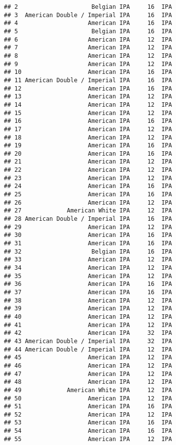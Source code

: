 \documentclass[
]{article}
\begin{document}
\begin{verbatim}
## 2                     Belgian IPA     16  IPA
## 3  American Double / Imperial IPA     16  IPA
## 4                    American IPA     16  IPA
## 5                     Belgian IPA     16  IPA
## 6                    American IPA     12  IPA
## 7                    American IPA     12  IPA
## 8                    American IPA     12  IPA
## 9                    American IPA     12  IPA
## 10                   American IPA     16  IPA
## 11 American Double / Imperial IPA     16  IPA
## 12                   American IPA     16  IPA
## 13                   American IPA     12  IPA
## 14                   American IPA     12  IPA
## 15                   American IPA     12  IPA
## 16                   American IPA     16  IPA
## 17                   American IPA     12  IPA
## 18                   American IPA     12  IPA
## 19                   American IPA     16  IPA
## 20                   American IPA     16  IPA
## 21                   American IPA     12  IPA
## 22                   American IPA     12  IPA
## 23                   American IPA     12  IPA
## 24                   American IPA     16  IPA
## 25                   American IPA     16  IPA
## 26                   American IPA     12  IPA
## 27             American White IPA     12  IPA
## 28 American Double / Imperial IPA     16  IPA
## 29                   American IPA     12  IPA
## 30                   American IPA     16  IPA
## 31                   American IPA     16  IPA
## 32                    Belgian IPA     16  IPA
## 33                   American IPA     12  IPA
## 34                   American IPA     12  IPA
## 35                   American IPA     12  IPA
## 36                   American IPA     16  IPA
## 37                   American IPA     16  IPA
## 38                   American IPA     12  IPA
## 39                   American IPA     12  IPA
## 40                   American IPA     12  IPA
## 41                   American IPA     12  IPA
## 42                   American IPA     32  IPA
## 43 American Double / Imperial IPA     32  IPA
## 44 American Double / Imperial IPA     12  IPA
## 45                   American IPA     12  IPA
## 46                   American IPA     12  IPA
## 47                   American IPA     12  IPA
## 48                   American IPA     12  IPA
## 49             American White IPA     12  IPA
## 50                   American IPA     12  IPA
## 51                   American IPA     16  IPA
## 52                   American IPA     12  IPA
## 53                   American IPA     16  IPA
## 54                   American IPA     16  IPA
## 55                   American IPA     12  IPA

\end{verbatim}
\end{document}
